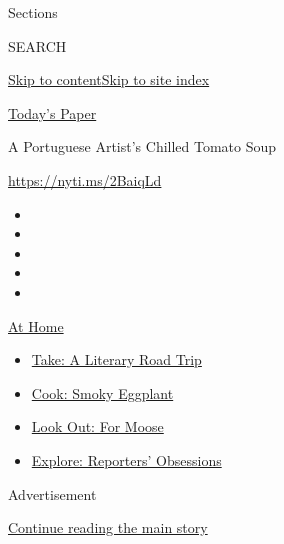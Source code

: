 Sections

SEARCH

\protect\hyperlink{site-content}{Skip to
content}\protect\hyperlink{site-index}{Skip to site index}

\href{https://myaccount.nytimes3xbfgragh.onion/auth/login?response_type=cookie\&client_id=vi}{}

\href{https://www.nytimes3xbfgragh.onion/section/todayspaper}{Today's
Paper}

A Portuguese Artist's Chilled Tomato Soup

\url{https://nyti.ms/2BaiqLd}

\begin{itemize}
\item
\item
\item
\item
\item
\end{itemize}

\href{https://www.nytimes3xbfgragh.onion/spotlight/at-home?action=click\&pgtype=Article\&state=default\&region=TOP_BANNER\&context=at_home_menu}{At
Home}

\begin{itemize}
\tightlist
\item
  \href{https://www.nytimes3xbfgragh.onion/2020/07/28/books/time-for-a-literary-road-trip.html?action=click\&pgtype=Article\&state=default\&region=TOP_BANNER\&context=at_home_menu}{Take:
  A Literary Road Trip}
\item
  \href{https://www.nytimes3xbfgragh.onion/2020/07/29/magazine/bored-with-your-home-cooking-some-smoky-eggplant-will-fix-that.html?action=click\&pgtype=Article\&state=default\&region=TOP_BANNER\&context=at_home_menu}{Cook:
  Smoky Eggplant}
\item
  \href{https://www.nytimes3xbfgragh.onion/2020/07/27/travel/moose-michigan-isle-royale.html?action=click\&pgtype=Article\&state=default\&region=TOP_BANNER\&context=at_home_menu}{Look
  Out: For Moose}
\item
  \href{https://www.nytimes3xbfgragh.onion/interactive/2020/at-home/even-more-reporters-editors-diaries-lists-recommendations.html?action=click\&pgtype=Article\&state=default\&region=TOP_BANNER\&context=at_home_menu}{Explore:
  Reporters' Obsessions}
\end{itemize}

Advertisement

\protect\hyperlink{after-top}{Continue reading the main story}

